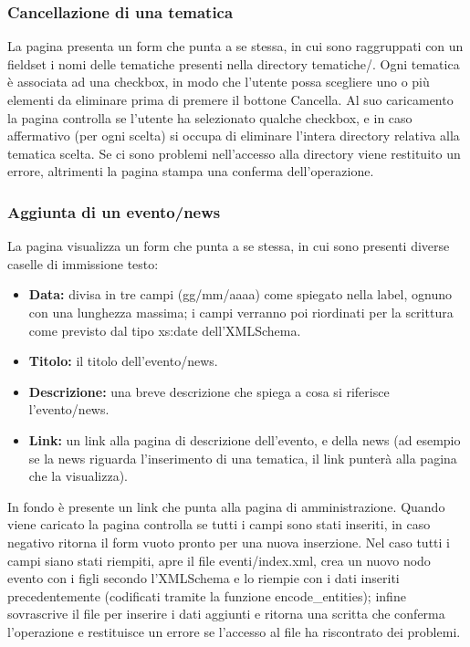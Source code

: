 \documentclass[a4paper,10pt]{article}
\begin{document}
\subsubsection{Cancellazione di una tematica}
La pagina presenta un form che punta a se stessa, in cui sono raggruppati con un fieldset i  nomi delle tematiche presenti nella directory tematiche/. Ogni tematica \`e associata ad una checkbox, in modo che l'utente possa scegliere uno o pi\`u elementi da eliminare prima di premere il bottone Cancella. Al suo caricamento la pagina controlla se l'utente ha selezionato qualche checkbox, e in caso affermativo (per ogni scelta) si occupa di eliminare l'intera directory relativa alla tematica scelta.
Se ci sono problemi nell'accesso alla directory viene restituito un errore, altrimenti la pagina stampa una conferma dell'operazione.

\subsubsection{Aggiunta di un evento/news}
La pagina visualizza un form che punta a se stessa, in cui sono presenti diverse caselle di immissione testo:
\begin{itemize}
\item \textbf{Data:} divisa in tre campi (gg/mm/aaaa) come spiegato nella label, ognuno con una lunghezza massima; i campi verranno poi riordinati per la scrittura come previsto dal tipo xs:date dell'XMLSchema.
\item \textbf{Titolo:} il titolo dell'evento/news.
\item \textbf{Descrizione:} una breve descrizione che spiega a cosa si riferisce l'evento/news.
\item \textbf{Link:} un link alla pagina di descrizione dell'evento, e della news (ad esempio se la news riguarda l'inserimento di una tematica, il link punter\`a alla pagina che la visualizza).
\end{itemize}
In fondo \`e presente un link che punta alla pagina di amministrazione.
Quando viene caricato la pagina controlla se tutti i campi sono stati inseriti, in caso negativo ritorna il form vuoto pronto per una nuova inserzione. Nel caso tutti i campi siano stati riempiti, apre il file eventi/index.xml, crea un nuovo nodo evento con i figli secondo l'XMLSchema e lo riempie con i dati inseriti precedentemente (codificati tramite la funzione encode{\_}entities); infine sovrascrive il file per inserire i dati aggiunti e ritorna una scritta che conferma l'operazione e restituisce un errore se l'accesso al file ha riscontrato dei problemi.
\end{document}
